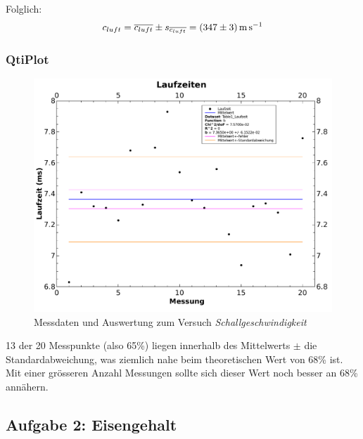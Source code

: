 Folglich:
\begin{equation}
    c_{luft} = \overline{c_{luft}} \pm s_{\overline{c_{luft}}} = \SI[separate-uncertainty = true]{347 \pm 3}{\meter\per\second}
\end{equation}

\clearpage
\subsubsection{QtiPlot}
\begin{figure}[th!]
    \centering
    \includegraphics[width=\textwidth]{images/aufgabe1.pdf}
    \caption{Messdaten und Auswertung zum Versuch \emph{Schallgeschwindigkeit}}
    \label{fig:gauss}
\end{figure}

13 der  20 Messpunkte (also 65\%)  liegen innerhalb des Mittelwerts  $\pm$ die
Standardabweichung,  was  ziemlich  nahe  beim  theoretischen  Wert  von  68\%
ist. Mit  einer gr\"osseren  Anzahl  Messungen sollte  sich  dieser Wert  noch
besser an 68\% ann\"ahern.

\clearpage
\subsection{Aufgabe 2: Eisengehalt}

